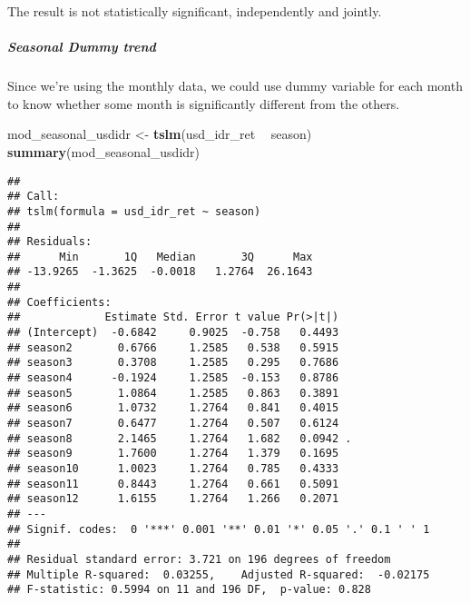 \documentclass[]{article}
\newenvironment{Shaded}{\begin{snugshade}}{\end{snugshade}}
\newcommand{\KeywordTok}[1]{\textcolor[rgb]{0.13,0.29,0.53}{\textbf{#1}}}
\newcommand{\DataTypeTok}[1]{\textcolor[rgb]{0.13,0.29,0.53}{#1}}
\newcommand{\StringTok}[1]{\textcolor[rgb]{0.31,0.60,0.02}{#1}}
\newcommand{\OperatorTok}[1]{\textcolor[rgb]{0.81,0.36,0.00}{\textbf{#1}}}
\newcommand{\NormalTok}[1]{#1}
\let\oldsubparagraph\subparagraph
\renewcommand{\subparagraph}[1]{\oldsubparagraph{#1}\mbox{}}
\begin{document}
The result is not statistically significant, independently and jointly.

\subparagraph{Seasonal Dummy trend}\label{seasonal-dummy-trend}

Since we're using the monthly data, we could use dummy variable for each
month to know whether some month is significantly different from the
others.

\begin{Shaded}
\begin{Highlighting}[]
\NormalTok{mod_seasonal_usdidr <-}\StringTok{ }\KeywordTok{tslm}\NormalTok{(usd_idr_ret }\OperatorTok{~}\StringTok{ }\NormalTok{season)}
\KeywordTok{summary}\NormalTok{(mod_seasonal_usdidr)}
\end{Highlighting}
\end{Shaded}

\begin{verbatim}
## 
## Call:
## tslm(formula = usd_idr_ret ~ season)
## 
## Residuals:
##      Min       1Q   Median       3Q      Max 
## -13.9265  -1.3625  -0.0018   1.2764  26.1643 
## 
## Coefficients:
##             Estimate Std. Error t value Pr(>|t|)  
## (Intercept)  -0.6842     0.9025  -0.758   0.4493  
## season2       0.6766     1.2585   0.538   0.5915  
## season3       0.3708     1.2585   0.295   0.7686  
## season4      -0.1924     1.2585  -0.153   0.8786  
## season5       1.0864     1.2585   0.863   0.3891  
## season6       1.0732     1.2764   0.841   0.4015  
## season7       0.6477     1.2764   0.507   0.6124  
## season8       2.1465     1.2764   1.682   0.0942 .
## season9       1.7600     1.2764   1.379   0.1695  
## season10      1.0023     1.2764   0.785   0.4333  
## season11      0.8443     1.2764   0.661   0.5091  
## season12      1.6155     1.2764   1.266   0.2071  
## ---
## Signif. codes:  0 '***' 0.001 '**' 0.01 '*' 0.05 '.' 0.1 ' ' 1
## 
## Residual standard error: 3.721 on 196 degrees of freedom
## Multiple R-squared:  0.03255,    Adjusted R-squared:  -0.02175 
## F-statistic: 0.5994 on 11 and 196 DF,  p-value: 0.828
\end{verbatim}

\begin{Shaded}
\end{Shaded}
\end{document}

